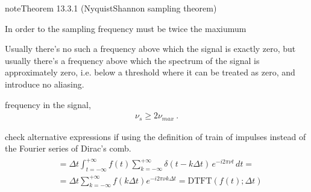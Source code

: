 \documentclass[letterpaper,10pt,english]{jupyterBook}
\begin{document}
\label{ch/complex/fourier-transforms:theorem-0}
\begin{sphinxadmonition}{note}{Theorem 13.3.1 (Nyquist\sphinxhyphen{}Shannon sampling theorem)}



\sphinxAtStartPar
In order to  the sampling frequency must be twice the maxiumum%
\begin{footnote}[1]\sphinxAtStartFootnote
Usually there’s no such a frequency above which the signal is exactly zero, but usually there’s a frequency above which the spectrum of the signal is approximately zero, i.e. below a threshold where it can be treated as zero, and introduce no aliasing.
%
\end{footnote} frequency in the signal,
\begin{equation*}
\begin{split}\nu_s \ge 2 \nu_{max} \ .\end{split}
\end{equation*}\end{sphinxadmonition}

\sphinxAtStartPar
{} check alternative expressions if using the definition of train of impulses instead of the Fourier series of Dirac’s comb.
\begin{equation}\label{equation:ch/complex/fourier-transforms:eq:dtft:2}
\begin{split}\begin{aligned}
 & = \Delta t \int_{t=-\infty}^{+\infty} f(t) \sum_{k=-\infty}^{+\infty} \delta(t - k \Delta t) \, e^{-i 2 \pi \nu t} \, dt = \\
 & = \Delta t \sum_{k=-\infty}^{+\infty} f(k \Delta t)  e^{-i 2 \pi \nu k \Delta t} = \text{DTFT}\left( f(t); \Delta t \right) 
\end{aligned}\end{split}
\end{equation}
\end{document}
